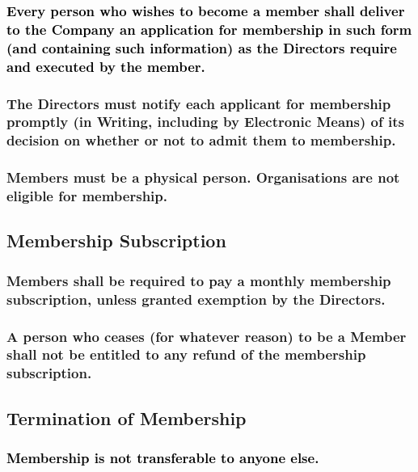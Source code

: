 \documentclass[12pt]{article}
\def\fakecolour{black}
\begin{document}
\subsubsection[Potential Members Must Apply for Membership]{\textcolor{\fakecolour}{Every person who wishes to become a member shall deliver to the Company an application for membership in such form (and containing such information) as the Directors require and executed by the member.}} %
\subsubsection[Directors Must notify Potential Members of Decision]{The Directors must notify each applicant for membership promptly (in Writing, including by Electronic Means) of its decision on whether or not to admit them to membership.} %
\subsubsection[Members May Not Be Organisations]{Members must be a physical person. Organisations are not eligible for membership.} %

\subsection{Membership Subscription}
\subsubsection[Members Pay Monthly Subscription]{Members shall be required to pay a monthly membership subscription, unless granted exemption by the Directors.}
\subsubsection[Members Not Entitled to Refund of Subscription]{A person who ceases (for whatever reason) to be a Member shall not be entitled to any refund of the membership subscription.}

\subsection{Termination of Membership}
\subsubsection[Membership Non-Transferable]{\textcolor{\fakecolour}{Membership is not transferable to anyone else.}}
\end{document}
